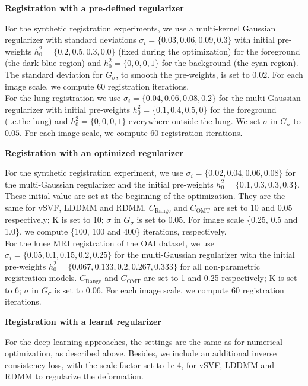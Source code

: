 \documentclass{article}
\numberwithin{equation}{section}
\newcommand{\ie}{{i.e.}}
\begin{document}
{\bf Registration with a pre-defined regularizer}

For the synthetic registration experiments, we use a multi-kernel Gaussian regularizer with standard deviations $\sigma_i= \{0.03, 0.06, 0.09, 0.3\}$ with initial pre-weights $h_0^2=\{0.2,0.5,0.3,0.0\}$ (fixed during the optimization) for the foreground (the dark blue region) and $h_0^2=\{0,0,0,1\}$ for the background (the cyan region). The standard deviation for $G_\sigma$, to smooth the pre-weights, is set to $0.02$. For each image scale, we compute 60 registration iterations. \\
For the lung registration we use $\sigma_i= \{0.04, 0.06, 0.08,0.2\}$ for the multi-Gaussian regularizer with initial pre-weights $h_0^2=\{0.1, 0.4, 0.5, 0\}$ for the foreground (\ie the lung) and $h_0^2=\{0,0,0,1\}$ everywhere outside the lung. We set $\sigma$ in $G_\sigma$ to $0.05$.  For each image scale, we compute 60 registration iterations.

{\bf Registration with an optimized regularizer}

For the synthetic registration experiment, we use $\sigma_i= \{0.02, 0.04, 0.06,0.08\}$ for the multi-Gaussian regularizer and the initial pre-weights $h_0^2=\{0.1, 0.3, 0.3, 0.3\}$. These initial value are set at the beginning of the optimization. They are the same for vSVF, LDDMM and RDMM. $C_{\mathrm{Range}}$ and $C_{\mathrm{OMT}}$ are set to 10 and 0.05 respectively; K is set to 10; $\sigma$ in $G_\sigma$ is set to $0.05$. For image scale \{0.25, 0.5 and 1.0\}, we  compute \{100, 100 and 400\} iterations, respectively.\\
For the knee MRI registration of the OAI dataset, we use $\sigma_i= \{0.05, 0.1, 0.15, 0.2, 0.25\}$ for the multi-Gaussian regularizer with the initial pre-weights $h_0^2=\{0.067, 0.133, 0.2, 0.267, 0.333\}$ for all non-parametric registration models.  $C_{\mathrm{Range}}$ and $C_{\mathrm{OMT}}$ are set to 1 and 0.25 respectively; K is set to 6; $\sigma$ in $G_\sigma$ is set to $0.06$. For each image scale, we compute 60 registration iterations.

{\bf Registration with a learnt regularizer} 

For the deep learning approaches, the settings are the same as for numerical optimization, as described above. Besides, we include an additional inverse consistency loss, with the scale factor set to 1e-4, for vSVF, LDDMM and RDMM to regularize the deformation.
\end{document}
